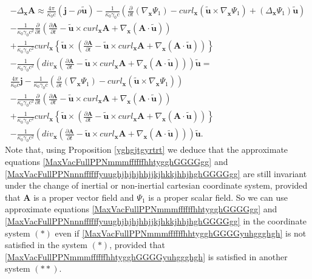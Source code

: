 \documentclass{article}
\theoremstyle{definition}
\theoremstyle{remark}
\renewcommand{\vec}[1]{\mathbf{#1}}
\newcommand{\er}{\eqref}
\newcommand{\er}{\eqref}
\begin{document}
\begin{multline}\label{MaxVacFullPPNnnnffffffyuughjhjhjhhjjkjhkkjhhjhghGGGGgg}
-\Delta_{\vec x}\vec A\approx
%
%
%
\frac{4\pi}{\kappa_0 c}\left(\vec j-\rho\vec {\tilde
u}\right)-\frac{1}{\kappa_0\gamma_0 c}\left(\frac{\partial}{\partial
t}\left(\nabla_{\vec x}\Psi_1\right)-curl_{\vec x}\left(\vec {\tilde
u}\times\nabla_{\vec x}\Psi_1\right)+\left(\Delta_{\vec
x}\Psi_1\right)\vec {\tilde u}\right)\\-\frac{1}{\kappa_0\gamma_0
c^2}\frac{\partial}{\partial t}\left(\frac{\partial\vec A}{\partial
t}-\vec {\tilde u}\times curl_{\vec x}\vec A+\nabla_{\vec
x}\left(\vec A\cdot\vec {\tilde
u}\right)\right)\\+\frac{1}{\kappa_0\gamma_0 c^2}curl_{\vec x}
\left\{\vec {\tilde u}\times
\left(\frac{\partial\vec A}{\partial t}-\vec {\tilde u}\times
curl_{\vec x}\vec A+\nabla_{\vec x}\left(\vec A\cdot\vec {\tilde
u}\right)\right)\right\}\\-\frac{1}{\kappa_0\gamma_0
c^2}\left(div_{\vec x}\left(\frac{\partial\vec A}{\partial t}-\vec
{\tilde u}\times curl_{\vec x}\vec A+\nabla_{\vec x}\left(\vec
A\cdot\vec {\tilde u}\right)\right)\right)\vec {\tilde u}=\\
\frac{4\pi}{\kappa_0 c}\vec j-\frac{1}{\kappa_0\gamma_0
c}\left(\frac{\partial}{\partial t}\left(\nabla_{\vec
x}\Psi_1\right)-curl_{\vec x}\left(\vec {\tilde u}\times\nabla_{\vec
x}\Psi_1\right)\right)\\-\frac{1}{\kappa_0\gamma_0
c^2}\frac{\partial}{\partial t}\left(\frac{\partial\vec A}{\partial
t}-\vec {\tilde u}\times curl_{\vec x}\vec A+\nabla_{\vec
x}\left(\vec A\cdot\vec {\tilde
u}\right)\right)\\+\frac{1}{\kappa_0\gamma_0 c^2}curl_{\vec x}
\left\{\vec {\tilde u}\times
\left(\frac{\partial\vec A}{\partial t}-\vec {\tilde u}\times
curl_{\vec x}\vec A+\nabla_{\vec x}\left(\vec A\cdot\vec {\tilde
u}\right)\right)\right\}\\-\frac{1}{\kappa_0\gamma_0
c^2}\left(div_{\vec x}\left(\frac{\partial\vec A}{\partial t}-\vec
{\tilde u}\times curl_{\vec x}\vec A+\nabla_{\vec x}\left(\vec
A\cdot\vec {\tilde u}\right)\right)\right)\vec {\tilde u}.
\end{multline}
Note that, using Proposition \ref{yghgjtgyrtrt} we deduce that the
approximate equations \er{MaxVacFullPPNmmmffffffhhtygghGGGGgg} and
\er{MaxVacFullPPNnnnffffffyuughjhjhjhhjjkjhkkjhhjhghGGGGgg} are
still invariant under the change of inertial or non-inertial
cartesian coordinate system, provided that $\vec A$ is a proper
vector field and $\Psi_1$ is a proper scalar field. So we can use
approximate equations \er{MaxVacFullPPNmmmffffffhhtygghGGGGgg} and
\er{MaxVacFullPPNnnnffffffyuughjhjhjhhjjkjhkkjhhjhghGGGGgg} in the
coordinate system $(*)$ even if
\er{MaxVacFullPPNmmmffffffhhtygghGGGGyuhggghgh} is not satisfied in
the system $(*)$, provided that
\er{MaxVacFullPPNmmmffffffhhtygghGGGGyuhggghgh} is satisfied in
another system $(**)$.
\end{document}
